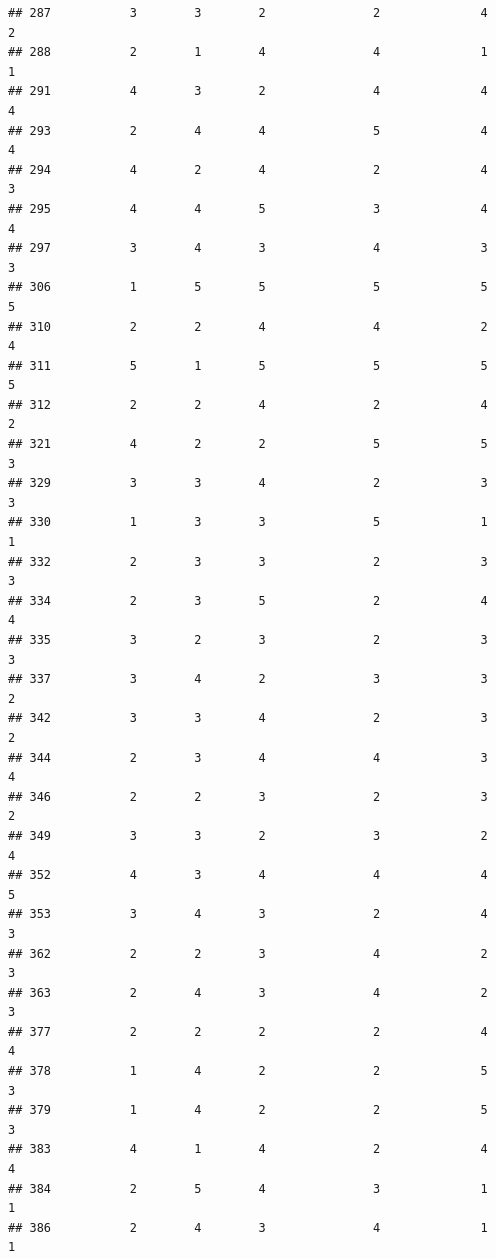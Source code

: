 \documentclass[
]{article}
\begin{document}
\begin{verbatim}
## 287           3        3        2               2              4             2
## 288           2        1        4               4              1             1
## 291           4        3        2               4              4             4
## 293           2        4        4               5              4             4
## 294           4        2        4               2              4             3
## 295           4        4        5               3              4             4
## 297           3        4        3               4              3             3
## 306           1        5        5               5              5             5
## 310           2        2        4               4              2             4
## 311           5        1        5               5              5             5
## 312           2        2        4               2              4             2
## 321           4        2        2               5              5             3
## 329           3        3        4               2              3             3
## 330           1        3        3               5              1             1
## 332           2        3        3               2              3             3
## 334           2        3        5               2              4             4
## 335           3        2        3               2              3             3
## 337           3        4        2               3              3             2
## 342           3        3        4               2              3             2
## 344           2        3        4               4              3             4
## 346           2        2        3               2              3             2
## 349           3        3        2               3              2             4
## 352           4        3        4               4              4             5
## 353           3        4        3               2              4             3
## 362           2        2        3               4              2             3
## 363           2        4        3               4              2             3
## 377           2        2        2               2              4             4
## 378           1        4        2               2              5             3
## 379           1        4        2               2              5             3
## 383           4        1        4               2              4             4
## 384           2        5        4               3              1             1
## 386           2        4        3               4              1             1

\end{verbatim}
\end{document}
